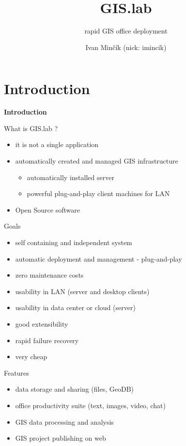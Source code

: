 \documentclass[12pt]{beamer}
\title{GIS.lab}
\subtitle{rapid GIS office deployment}
\author{Ivan Minčík (nick: imincik)}
\institute{FOSS4G-Europe 2014, Bremen}
\date{}
\begin{document}
\begin{frame}
	\titlepage
\end{frame}


\section{Introduction}
\begin{frame}
	\begin{center}
		\LARGE\textbf{Introduction}	
	\end{center}
\end{frame}


\begin{frame}{What is GIS.lab ?}
	\begin{itemize}[<+->]
		\item it is not a single application
		\item automatically created and managed GIS infrastructure
			\begin{itemize}[<+->]
				\item automatically installed server
				\item powerful plug-and-play client machines for LAN
			\end{itemize}
		\item Open Source software
	\end{itemize}
\end{frame}


\begin{frame}{Goals}
	\begin{itemize}[<+->]
		\item self containing and independent system
		\item automatic deployment and management - plug-and-play
		\item zero maintenance costs
		\item usability in LAN (server and desktop clients)
		\item usability in data center or cloud (server)
		\item good extensibility
		\item rapid failure recovery	
		\item very cheap
	\end{itemize}
\end{frame}


\begin{frame}{Features}
	\begin{itemize}[<+->]
		\item data storage and sharing (files, GeoDB)
		\item office productivity suite (text, images, video, chat)
		\item GIS data processing and analysis
		\item GIS project publishing on web
	\end{itemize}
\end{frame}
\end{document}
